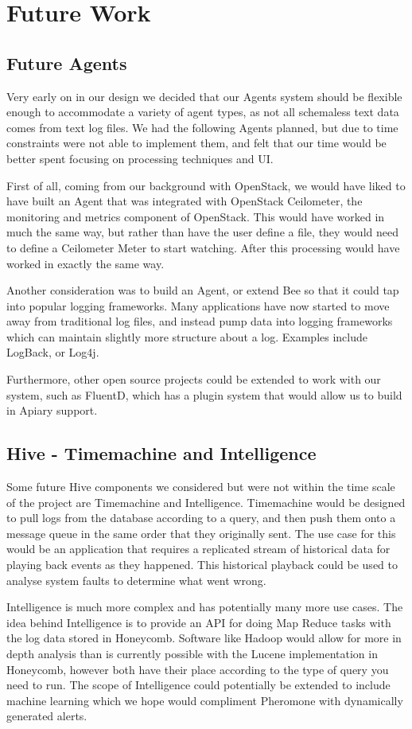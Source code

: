 \section{Future Work}

\subsection{Future Agents}

Very early on in our design we decided that our Agents system should be flexible
enough to accommodate a variety of agent types, as not all schemaless text data
comes from text log files. We had the following Agents planned, but due to time
constraints were not able to implement them, and felt that our time would be
better spent focusing on processing techniques and UI.

First of all, coming from our background with OpenStack, we would have liked
to have built an Agent that was integrated with OpenStack
Ceilometer\cite{ceilometer}, the
monitoring and metrics component of OpenStack. This would have worked in much
the same way, but rather than have the user define a file, they would need to
define a Ceilometer Meter to start watching. After this processing would have
worked in exactly the same way.

Another consideration was to build an Agent, or extend Bee so that it could
tap into popular logging frameworks. Many applications have now started to
move away from traditional log files, and instead pump data into logging
frameworks which can maintain slightly more structure about a log. Examples
include LogBack\cite{logback}, or Log4j\cite{log4j}.

Furthermore, other open source projects could be extended to work with our
system, such as FluentD\cite{fluentd}, which has a plugin system that would allow us
to build in Apiary support.

\subsection{Hive - Timemachine and Intelligence}

Some future Hive components we considered but were not within the time scale of
the project are Timemachine and Intelligence. Timemachine would be designed to
pull logs from the database according to a query, and then push them onto a
message queue in the same order that they originally sent. The use case for this
would be an application that requires a replicated stream of historical data for
playing back events as they happened. This historical playback could be used to
analyse system faults to determine what went wrong.

Intelligence is much more complex and has potentially many more use cases. The
idea behind Intelligence is to provide an API for doing Map Reduce tasks with
the log data stored in Honeycomb. Software like Hadoop\cite{hadoop} would allow for more
in depth analysis than is currently possible with the Lucene implementation in
Honeycomb, however both have their place according to the type of query you
need to run. The scope of Intelligence could potentially be extended to include
machine learning which we hope would compliment Pheromone with dynamically
generated alerts.
